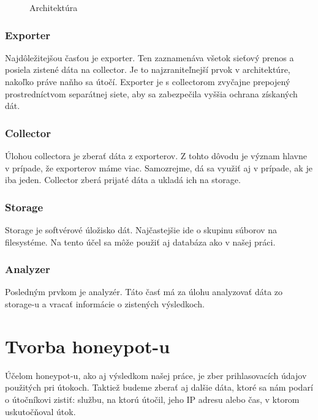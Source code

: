 \documentclass[12pt, oneside]{book}
\begin{document}
\begin{figure}[h]
\caption{Architektúra}
\end{figure}

\subsection{Exporter}
Najdôležitejšou časťou je exporter. Ten zaznamenáva všetok sieťový prenos a posiela zistené dáta na collector.
Je to najzraniteľnejší prvok v architektúre, nakoľko práve naňho sa útočí.
Exporter je s collectorom zvyčajne prepojený prostredníctvom separátnej siete, aby sa zabezpečila vyššia ochrana získaných dát.

\subsection{Collector}
Úlohou collectora je zberať dáta z exporterov. Z tohto dôvodu je význam hlavne v prípade, že exporterov máme viac.
Samozrejme, dá sa využiť aj v prípade, ak je iba jeden. Collector zberá prijaté dáta a ukladá ich na storage.

\subsection{Storage}
Storage je softvérové úložisko dát.
Najčastejšie ide o skupinu súborov na filesystéme.
Na tento účel sa môže použiť aj databáza ako v našej práci.

\subsection{Analyzer}
Posledným prvkom je analyzér.
Táto časť má za úlohu analyzovať dáta zo storage-u a vracať informácie o zistených výsledkoch.

\chapter{Tvorba honeypot-u}
Účelom honeypot-u, ako aj výsledkom našej práce, je zber prihlasovacích údajov použitých pri útokoch.
Taktiež budeme zberať aj dalšie dáta, ktoré sa nám podarí o útočníkovi zistiť: službu, na ktorú útočil, jeho IP adresu alebo čas, v ktorom uskutočňoval útok.
\end{document}
